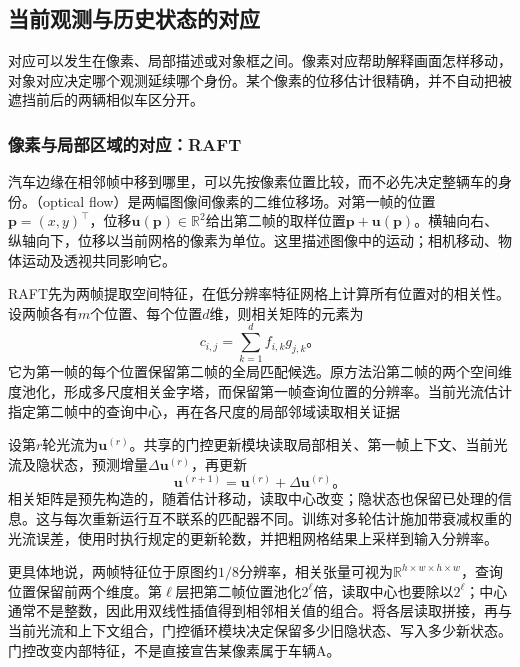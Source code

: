 \subsection{当前观测与历史状态的对应}
\label{sec:vision-video-correspondence}

对应可以发生在像素、局部描述或对象框之间。像素对应帮助解释画面怎样移动，对象对应决定哪个观测延续哪个身份。某个像素的位移估计很精确，并不自动把被遮挡前后的两辆相似车区分开。

\subsubsection{像素与局部区域的对应：RAFT}
\label{sec:vision-video-raft}

汽车边缘在相邻帧中移到哪里，可以先按像素位置比较，而不必先决定整辆车的身份。（optical flow）是两幅图像间像素的二维位移场。对第一帧的位置$\bm{p}=(x,y)^\top$，位移$\bm{u}(\bm{p})\in\mathbb{R}^{2}$给出第二帧的取样位置$\bm{p}+\bm{u}(\bm{p})$。横轴向右、纵轴向下，位移以当前网格的像素为单位。这里描述图像中的运动；相机移动、物体运动及透视共同影响它。

RAFT先为两帧提取空间特征，在低分辨率特征网格上计算所有位置对的相关性。设两帧各有$m$个位置、每个位置$d$维，则相关矩阵的元素为
\begin{equation}
  c_{i,j}=\sum_{k=1}^{d}f_{i,k}g_{j,k}\text{。}
  \label{eq:vision-video-all-pairs}
\end{equation}
它为第一帧的每个位置保留第二帧的全局匹配候选。原方法沿第二帧的两个空间维度池化，形成多尺度相关金字塔，而保留第一帧查询位置的分辨率。当前光流估计指定第二帧中的查询中心，再在各尺度的局部邻域读取相关证据

设第$r$轮光流为$\bm{u}^{(r)}$。共享的门控更新模块读取局部相关、第一帧上下文、当前光流及隐状态，预测增量$\Delta\bm{u}^{(r)}$，再更新
\[
  \bm{u}^{(r+1)}=\bm{u}^{(r)}+\Delta\bm{u}^{(r)}\text{。}
\]
相关矩阵是预先构造的，随着估计移动，读取中心改变；隐状态也保留已处理的信息。这与每次重新运行互不联系的匹配器不同。训练对多轮估计施加带衰减权重的光流误差，使用时执行规定的更新轮数，并把粗网格结果上采样到输入分辨率。

更具体地说，两帧特征位于原图约$1/8$分辨率，相关张量可视为$\mathbb{R}^{h\times w\times h\times w}$，查询位置保留前两个维度。第$\ell$层把第二帧位置池化$2^\ell$倍，读取中心也要除以$2^\ell$；中心通常不是整数，因此用双线性插值得到相邻相关值的组合。将各层读取拼接，再与当前光流和上下文组合，门控循环模块决定保留多少旧隐状态、写入多少新状态。门控改变内部特征，不是直接宣告某像素属于车辆A。

